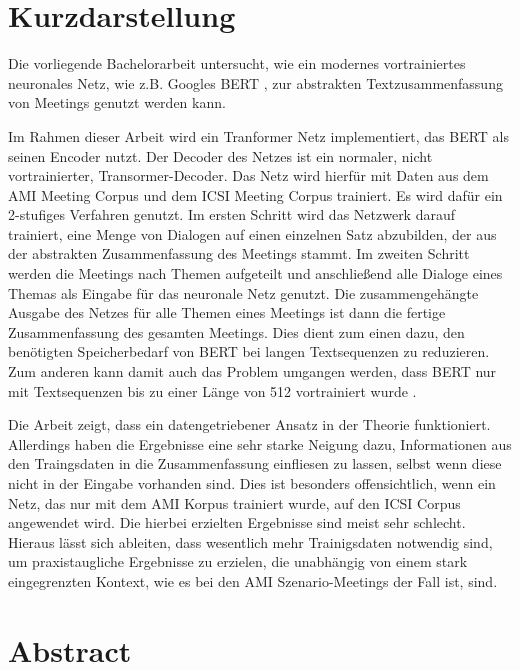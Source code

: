 \thispagestyle{empty}
\section*{Kurzdarstellung}
\label{sec:kurzdarstellung}

Die vorliegende Bachelorarbeit untersucht, wie ein modernes vortrainiertes neuronales Netz, wie z.B. Googles BERT \cite{devlin2018bert}, zur abstrakten Textzusammenfassung von Meetings genutzt werden kann.

Im Rahmen dieser Arbeit wird ein Tranformer Netz \cite{1706.03762} implementiert, das BERT als seinen Encoder nutzt.
Der Decoder des Netzes ist ein normaler, nicht vortrainierter, Transormer-Decoder.
Das Netz wird hierfür mit Daten aus dem AMI Meeting Corpus \cite{Mccowan05theami} und dem ICSI Meeting Corpus \cite{Janin} trainiert.
Es wird dafür ein 2-stufiges Verfahren genutzt.
Im ersten Schritt wird das Netzwerk darauf trainiert, eine Menge von Dialogen auf einen einzelnen Satz abzubilden, der aus der abstrakten Zusammenfassung des Meetings stammt.
Im zweiten Schritt werden die Meetings nach Themen aufgeteilt und anschließend alle Dialoge eines Themas als Eingabe für das neuronale Netz genutzt.
Die zusammengehängte Ausgabe des Netzes für alle Themen eines Meetings ist dann die fertige Zusammenfassung des gesamten Meetings.
Dies dient zum einen dazu, den benötigten Speicherbedarf von BERT bei langen Textsequenzen zu reduzieren.
Zum anderen kann damit auch das Problem umgangen werden, dass BERT nur mit Textsequenzen bis zu einer Länge von 512 vortrainiert wurde \cite[p.~13]{devlin2018bert}.

Die Arbeit zeigt, dass ein datengetriebener Ansatz in der Theorie funktioniert.
Allerdings haben die Ergebnisse eine sehr starke Neigung dazu, Informationen aus den Traingsdaten in die Zusammenfassung einfliesen zu lassen, selbst wenn diese nicht in der Eingabe vorhanden sind.
Dies ist besonders offensichtlich, wenn ein Netz, das nur mit dem AMI Korpus trainiert wurde, auf den ICSI Corpus angewendet wird.
Die hierbei erzielten Ergebnisse sind meist sehr schlecht.
Hieraus lässt sich ableiten, dass wesentlich mehr Trainigsdaten notwendig sind, um praxistaugliche Ergebnisse zu erzielen, die unabhängig von einem stark eingegrenzten Kontext, wie es bei den AMI Szenario-Meetings der Fall ist, sind.


\section*{Abstract}
\label{sec:abstract}

